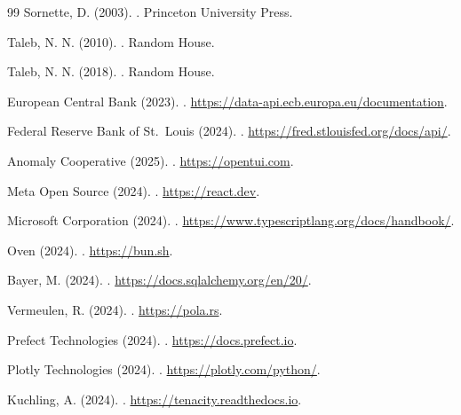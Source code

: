 \begin{thebibliography}{99}
Sornette, D. (2003).
\newblock {}.
\newblock Princeton University Press.

Taleb, N. N. (2010).
\newblock {}.
\newblock Random House.

Taleb, N. N. (2018).
\newblock {}.
\newblock Random House.

European Central Bank (2023).
\newblock {}.
\newblock \url{https://data-api.ecb.europa.eu/documentation}.

Federal Reserve Bank of St.\ Louis (2024).
\newblock {}.
\newblock \url{https://fred.stlouisfed.org/docs/api/}.

Anomaly Cooperative (2025).
\newblock {}.
\newblock \url{https://opentui.com}.

Meta Open Source (2024).
\newblock {}.
\newblock \url{https://react.dev}.

Microsoft Corporation (2024).
\newblock {}.
\newblock \url{https://www.typescriptlang.org/docs/handbook/}.

Oven (2024).
\newblock {}.
\newblock \url{https://bun.sh}.

Bayer, M. (2024).
\newblock {}.
\newblock \url{https://docs.sqlalchemy.org/en/20/}.

Vermeulen, R. (2024).
\newblock {}.
\newblock \url{https://pola.rs}.

Prefect Technologies (2024).
\newblock {}.
\newblock \url{https://docs.prefect.io}.

Plotly Technologies (2024).
\newblock {}.
\newblock \url{https://plotly.com/python/}.

Kuchling, A. (2024).
\newblock {}.
\newblock \url{https://tenacity.readthedocs.io}.


\end{thebibliography}
